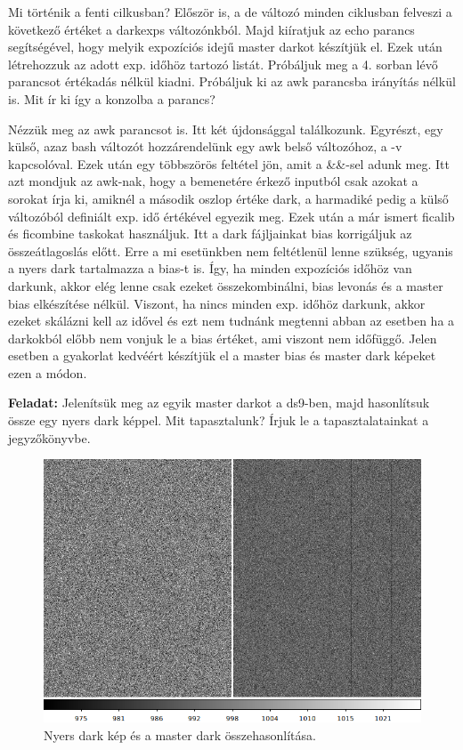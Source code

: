 \documentclass{article}
\begin{document}
Mi történik a fenti cilkusban? Először is, a de változó minden ciklusban
felveszi a következő értéket a darkexps változónkból. Majd kiíratjuk az echo
parancs segítségével, hogy melyik expozíciós idejű master darkot készítjük el.
Ezek után létrehozzuk az adott exp. időhöz tartozó listát. Próbáljuk meg a 4.
sorban lévő parancsot értékadás nélkül kiadni. Próbáljuk ki az awk parancsba
irányítás nélkül is. Mit ír ki így a konzolba a parancs?

Nézzük meg az awk parancsot is. Itt két újdonsággal találkozunk. Egyrészt, egy
külső, azaz bash változót hozzárendelünk egy awk belső változóhoz, a -v
kapcsolóval. Ezek után egy többszörös feltétel jön, amit a \&\&-sel adunk meg.
Itt azt mondjuk az awk-nak, hogy a bemenetére érkező inputból csak azokat a
sorokat írja ki, amiknél a második oszlop értéke dark, a harmadiké pedig a külső
változóból definiált exp. idő értékével egyezik meg.
Ezek után a már ismert ficalib és ficombine taskokat használjuk. Itt a dark
fájljainkat bias korrigáljuk az összeátlagoslás előtt. Erre a mi esetünkben nem
feltétlenül lenne szükség, ugyanis a nyers dark tartalmazza a bias-t is. Így, ha
minden expozíciós időhöz van darkunk, akkor elég lenne csak ezeket
összekombinálni, bias levonás és a master bias elkészítése nélkül. Viszont, ha
nincs minden exp. időhöz darkunk, akkor ezeket skálázni kell az idővel és ezt
nem tudnánk megtenni abban az esetben ha a darkokból előbb nem vonjuk le a bias
értéket, ami viszont nem időfüggő. Jelen esetben a gyakorlat kedvéért készítjük
el a master bias és master dark képeket ezen a módon.

{\bf Feladat:}
Jelenítsük meg az egyik master darkot a ds9-ben, majd hasonlítsuk össze egy
nyers dark képpel. Mit tapasztalunk? Írjuk le a tapasztalatainkat a
jegyzőkönyvbe.

\begin{figure}
    \centering
    \includegraphics[width=0.8\linewidth]{pics/darkcomp.png}
    \caption{Nyers dark kép és a master dark összehasonlítása.}
    \label{biascomp}
\end{figure}
\end{document}
